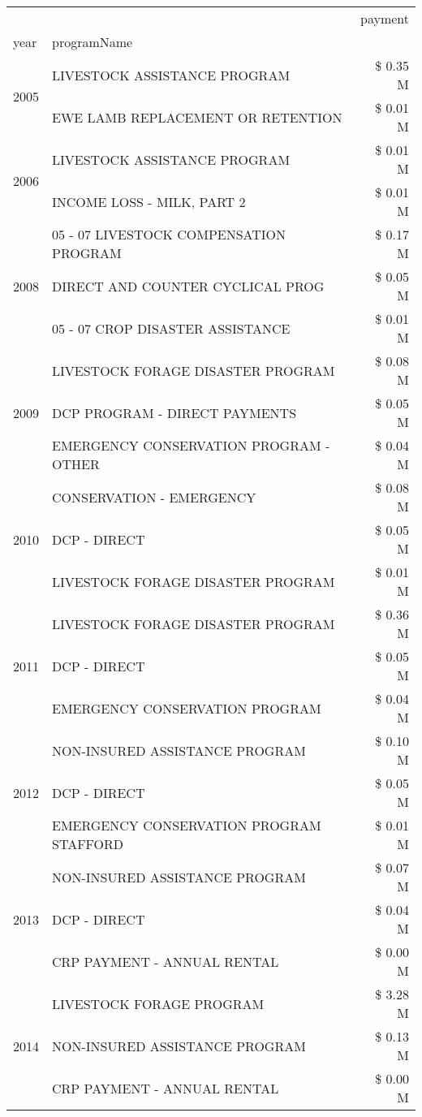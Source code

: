 \begin{tabular}{llr}
\toprule
 &  & payment \\
year & programName &  \\
\midrule
\multirow[t]{2}{*}{2005} & LIVESTOCK ASSISTANCE PROGRAM & \$ 0.35 M \\
 & EWE LAMB REPLACEMENT OR RETENTION & \$ 0.01 M \\
\cline{1-3}
\multirow[t]{2}{*}{2006} & LIVESTOCK ASSISTANCE PROGRAM & \$ 0.01 M \\
 & INCOME LOSS - MILK, PART 2 & \$ 0.01 M \\
\cline{1-3}
\multirow[t]{3}{*}{2008} & 05 - 07 LIVESTOCK COMPENSATION PROGRAM & \$ 0.17 M \\
 & DIRECT AND COUNTER CYCLICAL PROG & \$ 0.05 M \\
 & 05 - 07 CROP DISASTER ASSISTANCE & \$ 0.01 M \\
\cline{1-3}
\multirow[t]{3}{*}{2009} & LIVESTOCK FORAGE DISASTER  PROGRAM & \$ 0.08 M \\
 & DCP PROGRAM - DIRECT PAYMENTS & \$ 0.05 M \\
 & EMERGENCY CONSERVATION PROGRAM - OTHER & \$ 0.04 M \\
\cline{1-3}
\multirow[t]{3}{*}{2010} & CONSERVATION - EMERGENCY & \$ 0.08 M \\
 & DCP - DIRECT & \$ 0.05 M \\
 & LIVESTOCK FORAGE DISASTER PROGRAM & \$ 0.01 M \\
\cline{1-3}
\multirow[t]{3}{*}{2011} & LIVESTOCK FORAGE DISASTER PROGRAM & \$ 0.36 M \\
 & DCP - DIRECT & \$ 0.05 M \\
 & EMERGENCY CONSERVATION PROGRAM & \$ 0.04 M \\
\cline{1-3}
\multirow[t]{3}{*}{2012} & NON-INSURED ASSISTANCE PROGRAM & \$ 0.10 M \\
 & DCP - DIRECT & \$ 0.05 M \\
 & EMERGENCY CONSERVATION PROGRAM STAFFORD & \$ 0.01 M \\
\cline{1-3}
\multirow[t]{3}{*}{2013} & NON-INSURED ASSISTANCE PROGRAM & \$ 0.07 M \\
 & DCP - DIRECT & \$ 0.04 M \\
 & CRP PAYMENT - ANNUAL RENTAL & \$ 0.00 M \\
\cline{1-3}
\multirow[t]{3}{*}{2014} & LIVESTOCK FORAGE PROGRAM & \$ 3.28 M \\
 & NON-INSURED ASSISTANCE PROGRAM & \$ 0.13 M \\
 & CRP PAYMENT - ANNUAL RENTAL & \$ 0.00 M \\

\end{tabular}
